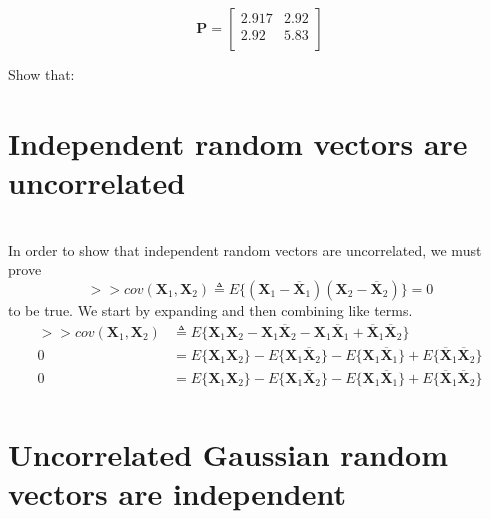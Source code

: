\documentclass[12pt,letterpaper, onecolumn]{exam}
\begin{document}
\begin{questions}
\begin{parts}
\begin{equation}
                        \mathbf{P} = 
                        \begin{bmatrix}
                            2.917 & 2.92 \\
                            2.92 & 5.83 \\
                        \end{bmatrix}
                    \end{equation}
        \end{parts}
\clearpage        
     Show that:
        \begin{parts}
            \part{Independent random vectors are uncorrelated}\\
                \solution
                    In order to show that independent random vectors are uncorrelated, we must prove
                    \[>>cov(\mathbf{X}_1,\mathbf{X}_2)\triangleq E\{(\mathbf{X}_1 - \overline{\mathbf{X}}_1)(\mathbf{X}_2 - \overline{\mathbf{X}}_2)\} = 0\]
                    to be true. We start by expanding and then combining like terms.
                    \begin{equation}
                        \begin{split}
                            >>cov(\mathbf{X}_1,\mathbf{X}_2) & \triangleq E\{\mathbf{X}_1\mathbf{X}_2 - \mathbf{X}_1\overline{\mathbf{X}}_2 - \mathbf{X}_1\overline{\mathbf{X}}_1 + \overline{\mathbf{X}}_1\overline{\mathbf{X}}_2\}\\
                            0 & = E\{\mathbf{X}_1\mathbf{X}_2\} - E\{\mathbf{X}_1\overline{\mathbf{X}}_2\} - E\{\mathbf{X}_1\overline{\mathbf{X}}_1\} + E\{\overline{\mathbf{X}}_1\overline{\mathbf{X}}_2\}\\
                            0 & = E\{\mathbf{X}_1\mathbf{X}_2\} - E\{\mathbf{X}_1\overline{\mathbf{X}}_2\} - E\{\mathbf{X}_1\overline{\mathbf{X}}_1\} + E\{\overline{\mathbf{X}}_1\overline{\mathbf{X}}_2\}\\               
                        \end{split}
                    \end{equation}
            \part{Uncorrelated Gaussian random vectors are independent}\\
                \solution
        \end{parts}    
 \clearpage   
        \begin{parts}

\end{parts}
\end{questions}
\end{document}
